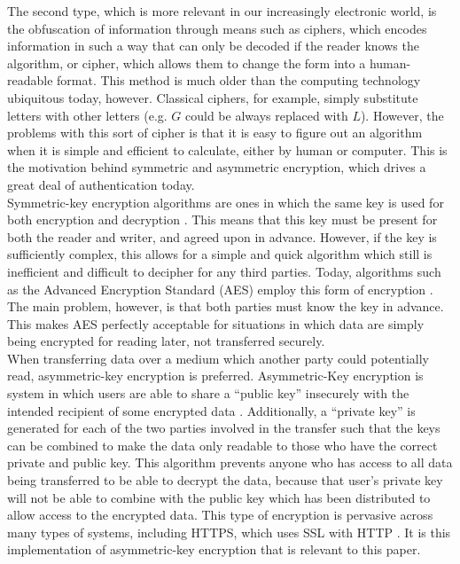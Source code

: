 \documentclass[10pt]{article}
\begin{document}
\begin{multicols}{2}
The second type, which is more relevant in our increasingly electronic world, is the obfuscation of information through means such as ciphers, which encodes information in such a way that can only be decoded if the reader knows the algorithm, or cipher, which allows them to change the form into a human-readable format. This method is much older than the computing technology ubiquitous today, however. Classical ciphers, for example, simply substitute letters with other letters (e.g. $G$ could be always replaced with $L$). However, the problems with this sort of cipher is that it is easy to figure out an algorithm when it is simple and efficient to calculate, either by human or computer. This is the motivation behind symmetric and asymmetric encryption, which drives a great deal of authentication today. \\

Symmetric-key encryption algorithms are ones in which the same key is used for both encryption and decryption \cite{cryptography}. This means that this key must be present for both the reader and writer, and agreed upon in advance. However, if the key is sufficiently complex, this allows for a simple and quick algorithm which still is inefficient and difficult to decipher for any third parties. Today, algorithms such as the Advanced Encryption Standard (AES) employ this form of encryption \cite{aes}. The main problem, however, is that both parties must know the key in advance. This makes AES perfectly acceptable for situations in which data are simply being encrypted for reading later, not transferred securely. \\

When transferring data over a medium which another party could potentially read, asymmetric-key encryption is preferred. Asymmetric-Key encryption is system in which users are able to share a ``public key'' insecurely with the intended recipient of some encrypted data \cite{ssl}. Additionally, a ``private key'' is generated for each of the two parties involved in the transfer such that the keys can be combined to make the data only readable to those who have the correct private and public key. This algorithm prevents anyone who has access to all data being transferred to be able to decrypt the data, because that user's private key will not be able to combine with the public key which has been distributed to allow access to the encrypted data. This type of encryption is pervasive across many types of systems, including HTTPS, which uses SSL with HTTP \cite{ssl}.  It is this implementation of asymmetric-key encryption that is relevant to this paper. \\


\end{multicols}
\end{document}
